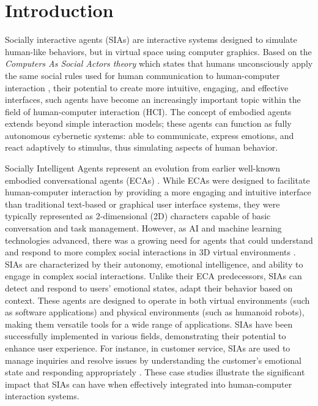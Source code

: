 \documentclass[12pt]{article}
\begin{document}
\newpage

\section{Introduction}

Socially interactive agents (SIAs)\cite{Gratch2021SIArapport} are interactive systems designed to simulate human-like behaviors, but in virtual space using computer graphics.
Based on the {\em Computers As Social Actors   theory} which states that humans unconsciously apply the same social rules used for human communication to human-computer interaction \cite{Nass1996}, their potential to create more intuitive, engaging, and effective interfaces, such agents have become an increasingly important topic within the field of human-computer interaction (HCI).  The concept of embodied agents extends beyond simple interaction models; these agents can function as fully autonomous cybernetic systems: able to communicate, express emotions, and react adaptively to stimulus, thus simulating aspects of human behavior.  

{Socially Intelligent Agents} represent an evolution from earlier well-known embodied conversational agents (ECAs) \cite{Cassell2000}.  While ECAs were designed to facilitate human-computer interaction by providing a more engaging and intuitive interface than traditional text-based or graphical user interface  systems, they were typically represented as 2-dimensional (2D)  characters capable of basic conversation and task management. However, as AI and machine learning technologies advanced, there was a growing need for agents that could understand and respond to more complex social interactions in 3D virtual environments \cite{Gratch2021SIArapport}.
SIAs are characterized by their autonomy, emotional intelligence, and ability to engage in complex social interactions. Unlike their ECA predecessors, SIAs can detect and respond to users' emotional states, adapt their behavior based on context. These agents are designed to operate in both virtual environments (such as software applications) and physical environments (such as humanoid robots), making them versatile tools for a wide range of applications.
SIAs have been successfully implemented in various fields, demonstrating their potential to enhance user experience. For instance, in customer service, SIAs are used to manage inquiries and resolve issues by understanding the customer's emotional state and responding appropriately \cite{Gratch2021SIArapport}.  These case studies illustrate the significant impact that SIAs can have when effectively integrated into human-computer interaction systems.
\end{document}
